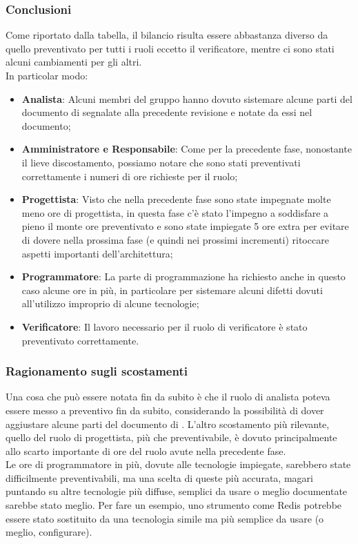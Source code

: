 \subsubsection{Conclusioni}
Come riportato dalla tabella, il bilancio risulta essere abbastanza diverso da quello preventivato per tutti i ruoli eccetto il verificatore, mentre ci sono stati alcuni cambiamenti per gli altri. \\
In particolar modo:
\begin{itemize}
    \item \textbf{Analista}: Alcuni membri del gruppo hanno dovuto sistemare alcune parti del documento di \AdR{} segnalate alla precedente revisione e notate da essi nel documento;
	\item \textbf{Amministratore e Responsabile}: Come per la precedente fase, nonostante il lieve discostamento, possiamo notare che sono stati preventivati correttamente i numeri di ore richieste per il ruolo;
    \item \textbf{Progettista}: Visto che nella precedente fase sono state impegnate molte meno ore di progettista, in questa fase c'è stato l'impegno a soddisfare a pieno il monte ore preventivato e sono state impiegate 5 ore extra per evitare di dovere nella prossima fase (e quindi nei prossimi incrementi) ritoccare aspetti importanti dell'architettura;
    \item \textbf{Programmatore}: La parte di programmazione ha richiesto anche in questo caso alcune ore in più, in particolare per sistemare alcuni difetti dovuti all'utilizzo improprio di alcune tecnologie;
	\item \textbf{Verificatore}: Il lavoro necessario per il ruolo di verificatore è stato preventivato correttamente. 
\end{itemize}
\subsubsection{Ragionamento sugli scostamenti}
Una cosa che può essere notata fin da subito è che il ruolo di analista poteva essere messo a preventivo fin da subito, considerando la possibilità di dover aggiustare alcune parti del documento di \AdR{}. L'altro scostamento più rilevante, quello del ruolo di progettista, più che preventivabile, è dovuto principalmente allo scarto importante di ore del ruolo avute nella precedente fase.\\
Le ore di programmatore in più, dovute alle tecnologie impiegate, sarebbero state difficilmente preventivabili, ma una scelta di queste più accurata, magari puntando su altre tecnologie più diffuse, semplici da usare o meglio documentate sarebbe stato meglio. Per fare un esempio, uno strumento come Redis potrebbe essere stato sostituito da una tecnologia simile ma più semplice da usare (o meglio, configurare).

